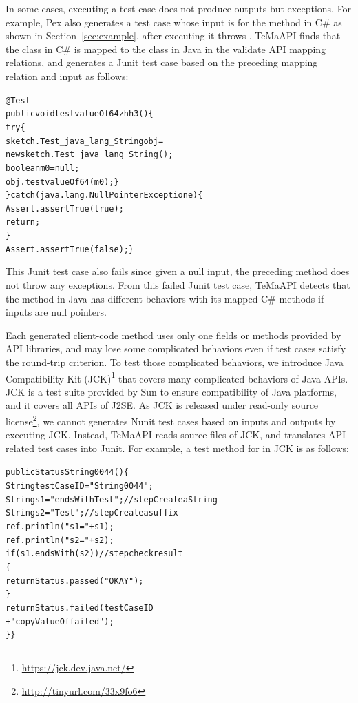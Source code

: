 In some cases, executing a test case does not produce outputs but exceptions. For example, Pex also generates a test case whose input is  for the  method in C\# as shown in Section~\ref{sec:example}, after executing it throws . TeMaAPI finds that the  class in C\# is mapped to the  class in Java in the validate API mapping relations, and generates a Junit test case based on the preceding mapping relation and input as follows:

\begin{CodeOut}%
\begin{alltt}
 @Test
 public void testvalueOf64zhh3()\{
   try\{
     sketch.Test_java_lang_String obj =
                       new sketch.Test_java_lang_String();
     boolean m0 = null;
     obj.testvalueOf64(m0);\}
   \}catch(java.lang.NullPointerException e)\{
       Assert.assertTrue(true);
       return;
   \}
   Assert.assertTrue(false);\}
\end{alltt}
\end{CodeOut}

This Junit test case also fails since given a null input, the preceding  method does not throw any exceptions. From this failed Junit test case, TeMaAPI detects that the  method in Java has different behaviors with its mapped C\# methods if inputs are null pointers.

Each generated client-code method uses only one fields or methods provided by API libraries, and may lose some complicated behaviors even if test cases satisfy the round-trip criterion. To test those complicated behaviors, we introduce Java Compatibility Kit (JCK)\footnote{\url{https://jck.dev.java.net/}} that covers many complicated behaviors of Java APIs. JCK is a test suite provided by Sun to ensure compatibility of Java platforms, and it covers all APIs of J2SE. As JCK is released under read-only source license\footnote{\url{http://tinyurl.com/33x9fo6}}, we cannot generates Nunit test cases based on inputs and outputs by executing JCK. Instead, TeMaAPI reads source files of JCK, and translates API related test cases into Junit. For example, a test method for  in JCK is as follows:

\begin{CodeOut}%
\begin{alltt}
  public Status String0044()\{
    String testCaseID = "String0044";
    String s1 = "endsWith Test"; //step Create a String
    String s2 = " Test";         //step Create a suffix
    ref.println("s1 = " + s1);
    ref.println("s2 = " + s2);
    if( s1.endsWith(s2) )        //step check result
    \{
       return Status.passed( "OKAY" );
    \}
       return Status.failed( testCaseID 
                             + " copyValueOf failed" );
    \}\}
\end{alltt}
\end{CodeOut}



